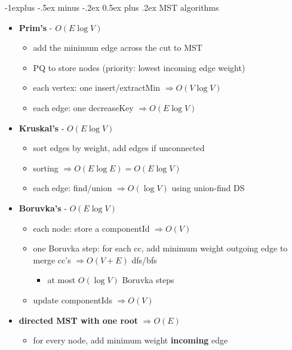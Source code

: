 \documentclass[10pt, landscape]{article}
\makeatletter
\renewcommand{\subsection}{\@startsection{subsection}{2}{0mm}%
                                {-1explus -.5ex minus -.2ex}%
                                {0.5ex plus .2ex}%
                                {\normalfont\normalsize\bfseries}}
\let\then\Rightarrow
\makeatother
\begin{document}
\begin{multicols}{4}
\subsection{MST algorithms}
\begin{itemize}
    \item \textbf{Prim's} - $O(E \log V)$
    \begin{itemize}
        \item add the minimum edge across the cut to MST
        \item PQ to store nodes (priority: lowest incoming edge weight)
        \item each vertex: one insert/extractMin $\then O(V \log V)$
        \item each edge: one decreaseKey $\then O(E \log V)$
    \end{itemize}
    \item \textbf{Kruskal's} - $O(E \log V)$
    \begin{itemize}
        \item sort edges by weight, add edges if unconnected
        \item sorting $\then O(E \log E) = O(E \log V)$
        \item each edge: find/union $\then O(\log V)$ using union-find DS
    \end{itemize}
    \item \textbf{Boruvka's} - $O(E \log V)$
    \begin{itemize}
        \item each node: store a componentId $\then O(V)$
        \item one Boruvka step: for each cc, add minimum weight outgoing edge to merge cc's $\then O(V + E)$ dfs/bfs
        \begin{itemize}
            \item at most $O(\log V)$ Boruvka steps
        \end{itemize}
        \item update componentIds $\then O(V)$
    \end{itemize}
    \item \textbf{directed MST with one root} $\then O(E)$
    \begin{itemize}
        \item for every node, add minimum weight \textbf{incoming} edge
    \end{itemize}
\end{itemize}


\end{multicols}
\end{document}
